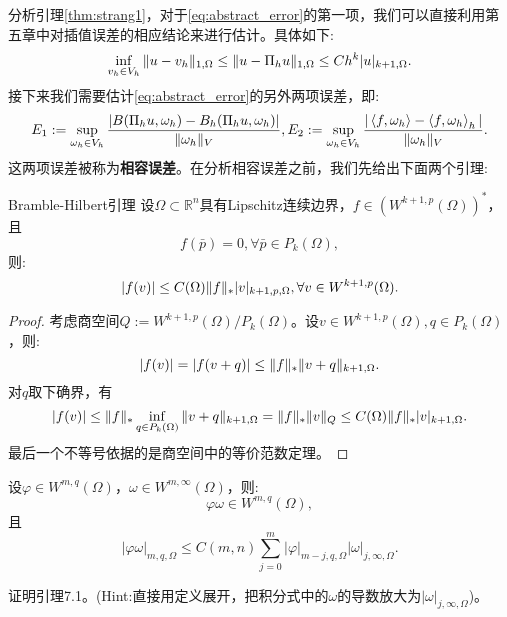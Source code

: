 分析引理\ref{thm:strang1}，对于\eqref{eq:abstract_error}的第一项，我们可以直接利用第五章中对插值误差的相应结论来进行估计。具体如下:
\begin{equation}
    \inf_{v_{h}\in V_{h}}\|u-v_{h}\|_{1,\Omega}\le\|u-\Pi_{h}u\|_{1,\Omega}\le Ch^{k}|u|_{k+1,\Omega}.
\end{equation}
接下来我们需要估计\eqref{eq:abstract_error}的另外两项误差，即:
\begin{equation}
    E_{1}:=\sup_{\omega_{h}\in V_{h}}\frac{|B(\Pi_{h}u,\omega_{h})-B_{h}(\Pi_{h}u,\omega_{h})|}{\|\omega_{h}\|_{V}},E_{2}:=\sup_{\omega_{h}\in V_{h}}\frac{|\left<f,\omega_{h}\right>-\left<f,\omega_{h}\right>_{h}|}{\|\omega_{h}\|_{V}}.
\end{equation}
这两项误差被称为\textbf{相容误差}。在分析相容误差之前，我们先给出下面两个引理:
\begin{theorem}{Bramble-Hilbert引理}
    \label{thm:B-H Lem}
   设$\Omega\subset\mathbb{R}^{n}$具有Lipschitz连续边界，$f\in (W^{k+1,p}(\Omega))^{*}$，且
   \begin{equation}
        f(\bar{p})=0,\forall \bar{p}\in P_{k}(\Omega),
   \end{equation} 
   则:
   \begin{equation}
    |f(v)|\le C(\Omega)\|f\|_{*}|v|_{k+1,p,\Omega},\forall v\in W^{k+1,p}(\Omega).
   \end{equation}
\end{theorem}
\begin{proof}
    考虑商空间$Q:=W^{k+1,p}(\Omega)/P_{k}(\Omega)$。设$v\in W^{k+1,p}(\Omega),q\in P_{k}(\Omega)$，则:
    \begin{equation}
        |f(v)|=|f(v+q)|\le\|f\|_{*}\|v+q\|_{k+1,\Omega}.
    \end{equation}
    对$q$取下确界，有
    \begin{equation}
        |f(v)|\le\|f\|_{*}\inf_{q\in P_{k}(\Omega)}\|v+q\|_{k+1,\Omega}=\|f\|_{*}\|v\|_{Q}\le C(\Omega)\|f\|_{*}|v|_{k+1,\Omega}.
    \end{equation}
    最后一个不等号依据的是商空间中的等价范数定理。
\end{proof}
\begin{lemma}
    设$\varphi\in W^{m,q}(\Omega)$，$\omega\in W^{m,\infty}(\Omega)$，则:
    \begin{equation}
        \varphi\omega\in W^{m,q}(\Omega),
    \end{equation}
    且
    \begin{equation}
        |\varphi\omega|_{m,q,\Omega}\le C(m,n)\sum_{j=0}^{m}|\varphi|_{m-j,q,\Omega}|\omega|_{j,\infty,\Omega}.
    \end{equation}
\end{lemma}
\begin{exercise}
    证明引理7.1。(Hint:直接用定义展开，把积分式中的$\omega$的导数放大为$|\omega|_{j,\infty,\Omega}$)。
\end{exercise}
